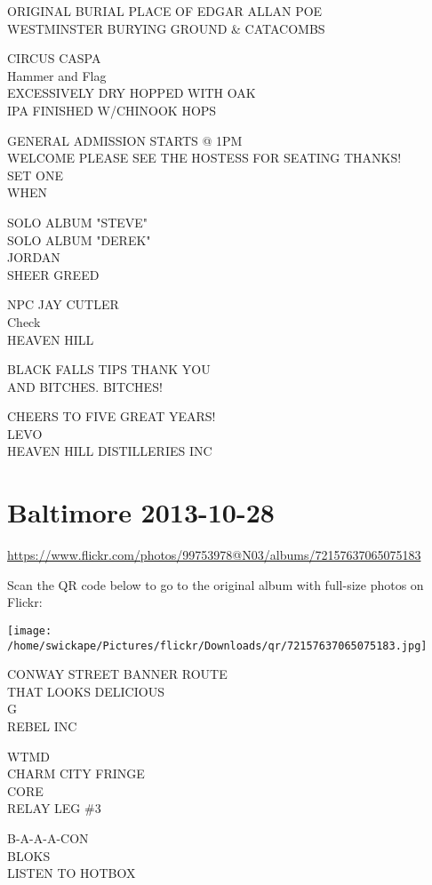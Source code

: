 \documentclass[10pt,letterpaper]{article}
\begin{document}
ORIGINAL BURIAL PLACE OF EDGAR ALLAN POE\\
WESTMINSTER BURYING GROUND \& CATACOMBS

CIRCUS CASPA\\
Hammer and Flag\\
EXCESSIVELY DRY HOPPED WITH OAK\\
IPA FINISHED W/CHINOOK HOPS

GENERAL ADMISSION STARTS @ 1PM\\
WELCOME PLEASE SEE THE HOSTESS FOR SEATING THANKS!\\
SET ONE\\
WHEN

SOLO ALBUM "STEVE"\\
SOLO ALBUM "DEREK"\\
JORDAN\\
SHEER GREED

NPC JAY CUTLER\\
Check\\
HEAVEN HILL

BLACK FALLS TIPS THANK YOU\\
AND BITCHES.  BITCHES!

CHEERS TO FIVE GREAT YEARS!\\
LEVO\\
HEAVEN HILL DISTILLERIES INC
\pagebreak

\section*{Baltimore 2013-10-28}

\url{https://www.flickr.com/photos/99753978@N03/albums/72157637065075183}

Scan the QR code below to go to the original album with full-size photos on Flickr:

\texttt{[image: /home/swickape/Pictures/flickr/Downloads/qr/72157637065075183.jpg]}
\pagebreak

CONWAY STREET BANNER ROUTE\\
THAT LOOKS DELICIOUS\\
G\\
REBEL INC

WTMD\\
CHARM CITY FRINGE\\
CORE\\
RELAY LEG \#3

B{-}A{-}A{-}A{-}CON\\
BLOKS\\
LISTEN TO HOTBOX
\end{document}
